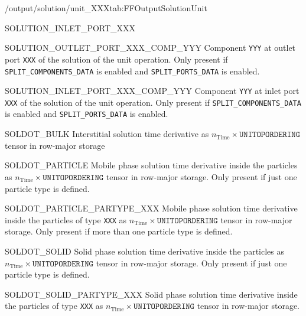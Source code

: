 \begin{groupscope}{/output/solution/unit\_XXX}{tab:FFOutputSolutionUnit}
\begin{dataset}[type=double,unit={\si{\mol\per\cubic\metre\of{IV}}}]{SOLUTION\_INLET\_PORT\_XXX}
  \end{dataset}
  \begin{dataset}[type=double,unit={\si{\mol\per\cubic\metre\of{IV}}}]{SOLUTION\_OUTLET\_PORT\_XXX\_COMP\_YYY}
    Component \texttt{YYY} at outlet port \texttt{XXX} of the solution of the unit operation.
    Only present if \texttt{SPLIT\_COMPONENTS\_DATA} is enabled and \texttt{SPLIT\_PORTS\_DATA} is enabled.
  \end{dataset}
  \begin{dataset}[type=double,unit={\si{\mol\per\cubic\metre\of{IV}}}]{SOLUTION\_INLET\_PORT\_XXX\_COMP\_YYY}
    Component \texttt{YYY} at inlet port \texttt{XXX} of the solution of the unit operation.
    Only present if \texttt{SPLIT\_COMPONENTS\_DATA} is enabled and \texttt{SPLIT\_PORTS\_DATA} is enabled.
  \end{dataset}
  \begin{dataset}[type=double,unit={\si{\mol\per\cubic\metre\of{IV}\per\second}}]{SOLDOT\_BULK}
    Interstitial solution time derivative as $n_{\text{Time}} \times \texttt{UNITOPORDERING}$ tensor in row-major storage
  \end{dataset}
  \begin{dataset}[type=double,unit={\si{\mol\per\cubic\metre\of{MP}\per\second}}]{SOLDOT\_PARTICLE}
    Mobile phase solution time derivative inside the particles as $n_{\text{Time}} \times \texttt{UNITOPORDERING}$ tensor in row-major storage.
    Only present if just one particle type is defined.
  \end{dataset}
  \begin{dataset}[type=double,unit={\si{\mol\per\cubic\metre\of{MP}\per\second}}]{SOLDOT\_PARTICLE\_PARTYPE\_XXX}
    Mobile phase solution time derivative inside the particles of type \texttt{XXX} as $n_{\text{Time}} \times \texttt{UNITOPORDERING}$ tensor in row-major storage.
    Only present if more than one particle type is defined.
  \end{dataset}
  \begin{dataset}[type=double,unit={\si{\mol\per\cubic\metre\of{MP}\per\second}}]{SOLDOT\_SOLID}
    Solid phase solution time derivative inside the particles as $n_{\text{Time}} \times \texttt{UNITOPORDERING}$ tensor in row-major storage.
    Only present if just one particle type is defined.
  \end{dataset}
  \begin{dataset}[type=double,unit={\si{\mol\per\cubic\metre\of{SP}\per\second}}]{SOLDOT\_SOLID\_PARTYPE\_XXX}
    Solid phase solution time derivative inside the particles of type \texttt{XXX} as $n_{\text{Time}} \times \texttt{UNITOPORDERING}$ tensor in row-major storage.

\end{dataset}
\end{groupscope}
